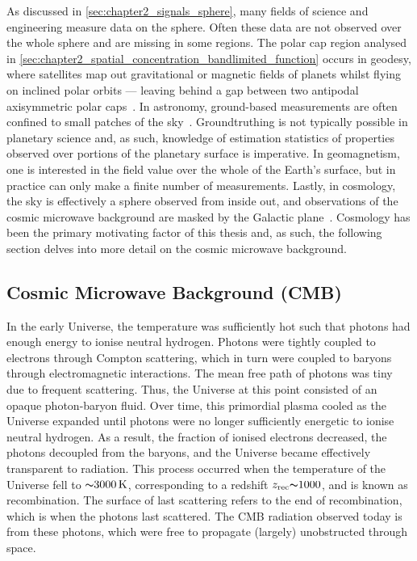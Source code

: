 As discussed in \cref{sec:chapter2_signals_sphere}, many fields of science and engineering measure data on the sphere.
Often these data are not observed over the whole sphere and are missing in some regions.
The polar cap region analysed in \cref{sec:chapter2_spatial_concentration_bandlimited_function} occurs in geodesy, where satellites map out gravitational or magnetic fields of planets whilst flying on inclined polar orbits --- leaving behind a gap between two antipodal axisymmetric polar caps~\cite{Simons2006a}.
In astronomy, ground-based measurements are often confined to small patches of the sky~\cite{Peebles1973,Tegmark1995}.
Groundtruthing is not typically possible in planetary science and, as such, knowledge of estimation statistics of properties observed over portions of the planetary surface is imperative.
In geomagnetism, one is interested in the field value over the whole of the Earth's surface, but in practice can only make a finite number of measurements.
Lastly, in cosmology, the sky is effectively a sphere observed from inside out, and observations of the cosmic microwave background are masked by the Galactic plane~\cite{Tegmark1996,Hinshaw2003}.
Cosmology has been the primary motivating factor of this thesis and, as such, the following section delves into more detail on the cosmic microwave background.

\subsection{Cosmic Microwave Background (CMB)}\label{sec:chapter2_cosmic_microwave_background}

In the early Universe, the temperature was sufficiently hot such that photons had enough energy to ionise neutral hydrogen.
Photons were tightly coupled to electrons through Compton scattering, which in turn were coupled to baryons through electromagnetic interactions.
The mean free path of photons was tiny due to frequent scattering.
Thus, the Universe at this point consisted of an opaque photon-baryon fluid.
Over time, this primordial plasma cooled as the Universe expanded until photons were no longer sufficiently energetic to ionise neutral hydrogen.
As a result, the fraction of ionised electrons decreased, the photons decoupled from the baryons, and the Universe became effectively transparent to radiation.
This process occurred when the temperature of the Universe fell to \({\thicksim}\SI{3000}{\kelvin}\), corresponding to a redshift \(z_{\text{rec}} {\thicksim}\num{1000}\), and is known as recombination.
The surface of last scattering refers to the end of recombination, which is when the photons last scattered.
The CMB radiation observed today is from these photons, which were free to propagate (largely) unobstructed through space.

